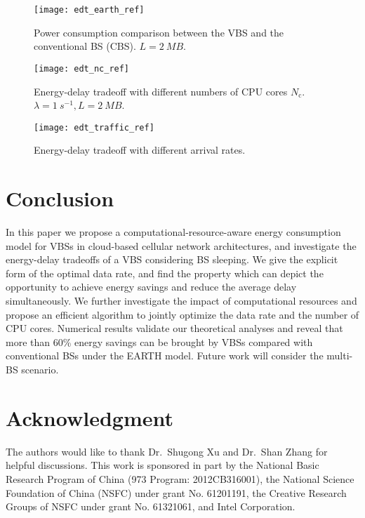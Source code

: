 \documentclass[conference]{IEEEtran}
\begin{document}
\begin{figure}[!t]
  \centering
  \texttt{[image: edt\_earth\_ref]}
  \caption{Power consumption comparison between the VBS and the conventional BS
  (CBS).  $L = \SI{2}{MB}$.}
  \label{fig:edt-earth}
\end{figure}

\begin{figure}[!t]
  \centering
  \texttt{[image: edt\_nc\_ref]}
  \caption[Energy-delay tradeoff with different numbers of CPU cores.]{Energy-delay tradeoff with different numbers of CPU cores $N_\text{c}$.\\
  $\lambda = \SI{1}{s^{-1}}, L = \SI{2}{MB}$.}
  \label{fig:edt-Nc}
\end{figure}

\begin{figure}[!t]
  \centering
  \texttt{[image: edt\_traffic\_ref]}
  \caption{Energy-delay tradeoff with different arrival rates.}
  \label{fig:edt-traffic}
\end{figure}

\section{Conclusion}
\label{sec:con}

In this paper we propose a computational-resource-aware energy consumption
model for VBSs in cloud-based cellular network architectures, and
investigate the energy-delay tradeoffs of a VBS considering BS sleeping.
We give the explicit form of the optimal data rate, and find the property which
can depict the opportunity
to achieve energy savings and reduce the average delay simultaneously.  We
further investigate the impact of computational resources and propose an
efficient algorithm to jointly optimize the data rate and
the number of CPU cores. Numerical results validate our theoretical analyses and reveal
that more than 60\% energy savings can be brought by VBSs compared with
conventional BSs under the EARTH model.  Future work will consider
the multi-BS scenario.

\section*{Acknowledgment}

The authors would like to thank Dr.~Shugong Xu and Dr.~Shan Zhang for
helpful discussions.
This work is sponsored in part by the National Basic Research Program of China
(973 Program: 2012CB316001), the National Science Foundation of China (NSFC)
under grant No. 61201191, the Creative Research Groups of NSFC under grant No.
61321061, and Intel Corporation.
\end{document}
